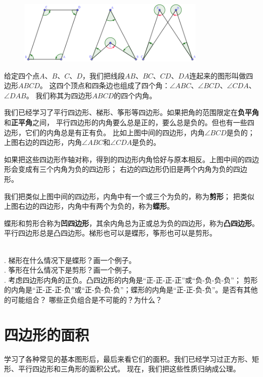 \documentclass[12pt,UTF8]{ctexbook}
\begin{document}
\begin{figure}[H] 
    \vspace{4pt}
    \centering
    \includegraphics[width=0.8\textwidth]{tu/凹四边形1.png}
\end{figure}

给定四个点$A$、$B$、$C$、$D$，我们把线段$AB$、$BC$、$CD$、$DA$连起来的图形叫做四边形$ABCD$。
这四个顶点和四条边也组成了四个角：$\angle ABC$、$\angle BCD$、$\angle CDA$、$\angle DAB$。
我们称其为四边形$ABCD$的四个内角。

我们已经学习了平行四边形、梯形、筝形等四边形。如果把角的范围限定在\textbf{负平角}和\textbf{正平角}之间，
平行四边形的内角要么总是正的，要么总是负的。但也有一些四边形，它们的内角总是有正有负。
比如上图中间的四边形，内角$\angle BCD$是负的；上图右边的四边形，内角$\angle ABC$和$\angle CDA$是负的。

如果把这些四边形作轴对称，得到的四边形内角恰好与原本相反。上图中间的四边形会变成有三个内角为负的四边形；
右边的四边形仍旧是两个内角为负的四边形。

我们把类似上图中间的四边形，内角中有一个或三个为负的，称为\textbf{剪形}；
把类似上图右边的四边形，内角中有两个为负的，称为\textbf{蝶形}。

蝶形和剪形合称为\textbf{凹四边形}，其余内角总为正或总为负的四边形，称为\textbf{凸四边形}。
平行四边形总是凸四边形。梯形也可以是蝶形，筝形也可以是剪形。

\begin{sk}\label{sk:5-4-0}
    \mbox{}\\
    . 梯形在什么情况下是蝶形？画一个例子。\\
    . 筝形在什么情况下是剪形？画一个例子。\\
    . 考虑四边形内角的正负。凸四边形的内角是“正-正-正-正”或“负-负-负-负”；
    剪形的内角是“正-正-正-负”或“正-负-负-负”；蝶形的内角是“正-正-负-负”。是否有其他的可能组合？
    哪些正负组合是不可能的？为什么？
\end{sk}

\section{四边形的面积}
学习了各种常见的基本图形后，最后来看它们的面积。我们已经学习过正方形、矩形、平行四边形和三角形的面积公式。
现在，我们把这些性质归纳成公理。
\end{document}
